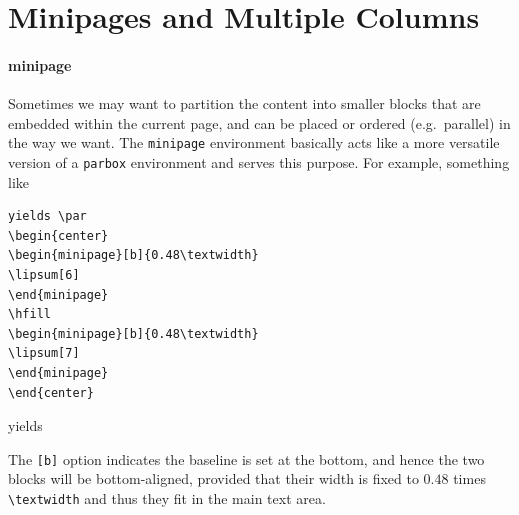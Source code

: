 \section{Minipages and Multiple Columns}

\paragraph{minipage}
Sometimes we may want to partition the content into smaller blocks that are embedded within the current page, and can be placed or ordered (e.g.\ parallel) in the way we want. The \verb|minipage| environment basically acts like a more versatile version of a \verb|parbox| environment and serves this purpose. For example, something like
\begin{lstlisting}
yields \par
\begin{center}
\begin{minipage}[b]{0.48\textwidth}
\lipsum[6]
\end{minipage}
\hfill
\begin{minipage}[b]{0.48\textwidth}
\lipsum[7]
\end{minipage}    
\end{center}      
\end{lstlisting}
yields \par
\begin{center}
\begin{minipage}[b]{0.48\textwidth}
\lipsum[6]
\end{minipage}
\hfill
\begin{minipage}[b]{0.48\textwidth}
\lipsum[7]
\end{minipage}    
\end{center}
The \verb|[b]| option indicates the baseline is set at the bottom, and hence the two blocks will be bottom-aligned, provided that their width is fixed to $0.48$ times \texttt{\textbackslash textwidth} and thus they fit in the main text area.

